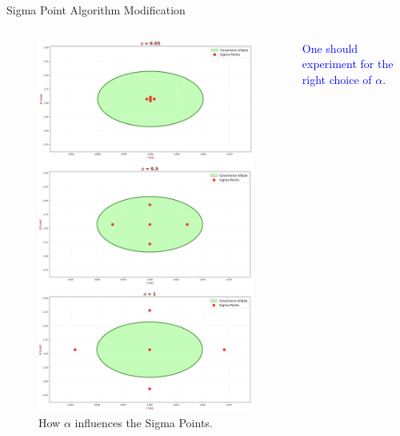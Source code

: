 \begin{frame}{Sigma Point Algorithm Modification}
\begin{columns}
\begin{figure}
            \includegraphics[trim={0 0cm 0 57cm},clip, width=0.9\linewidth]{Figures//Part3/alphaEffectOnSigmaPoints.png}
            \caption{How $\alpha$ influences the Sigma Points.}
        \end{figure}

        \textcolor{blue}{One should experiment for the right choice of $\alpha$.}
\end{columns}    
\end{frame}

